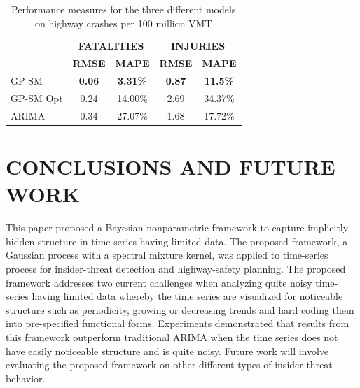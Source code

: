 \documentclass[letterpaper]{article}
\begin{document}
\begin{table}[h]
\caption{Performance measures for the three different models on highway crashes per 100 million VMT}
\label{tab:performance-measures-crashes}
\begin{center}
\begin{tabular}{l@{\quad}cc@{\quad}cc}
  \toprule
  \multirow{2}{*}{\raisebox{-\heavyrulewidth}{\bf MODEL}} & \multicolumn{2}{c}{\bf FATALITIES} & \multicolumn{2}{c}{\bf INJURIES} \\
  \cmidrule{2-5}
  & {\bf RMSE} & {\bf MAPE} & {\bf RMSE} & {\bf MAPE} \\
  \midrule
  GP-SM & {\bf 0.06} & {\bf 3.31\%} & {\bf 0.87} & {\bf 11.5\%}  \\
  GP-SM Opt & 0.24 & 14.00\% & 2.69 & 34.37\%  \\
  ARIMA & 0.34 & 27.07\% & 1.68 & 17.72\%  \\
  \bottomrule
\end{tabular}
\end{center}
\end{table}


\section{CONCLUSIONS AND FUTURE WORK}\label{conclusions-and-future-work}
This paper proposed a Bayesian nonparametric framework to capture implicitly hidden structure in time-series having limited data. The proposed framework, a Gaussian process with a spectral mixture kernel, was applied to time-series process for insider-threat detection and highway-safety planning. The proposed framework addresses two current challenges when analyzing quite noisy time-series having limited data whereby the time series are visualized for noticeable structure such as periodicity, growing or decreasing trends and hard coding them into pre-specified functional forms. Experiments demonstrated that results from this framework outperform traditional ARIMA when the time series does not have easily noticeable structure and is quite noisy. Future work will involve evaluating the proposed framework on other different types of insider-threat behavior. 


\end{document}

